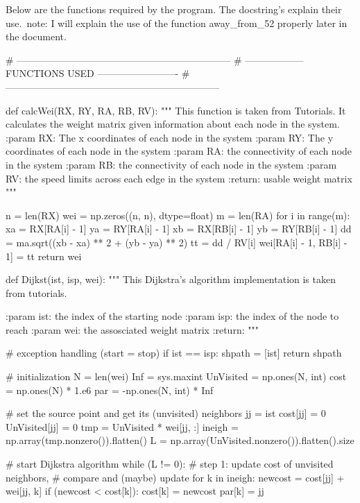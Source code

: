 \documentclass[paper=a4, fontsize=12pt]{scrartcl} %
\numberwithin{equation}{section}       %
\numberwithin{figure}{section}         %
\numberwithin{table}{section}          %
\begin{document}
Below are the functions required by the program. The docstring's explain their use.\
note: I will explain the use of the function away\_from\_52 properly later in the document.

\leavevmode
\newline

\begin{python}
# ------------------------------------------------------------------
# ------------------    FUNCTIONS USED     -------------------------
# ------------------------------------------------------------------

def calcWei(RX, RY, RA, RB, RV):
    """
    This function is taken from Tutorials. It calculates the weight matrix
    given information about each node in the system.
    :param RX: The x coordinates of each node in the system
    :param RY: The y coordinates of each node in the system
    :param RA: the connectivity of each node in the system
    :param RB: the connectivity of each node in the system
    :param RV: the speed limits across each edge in the system
    :return: usable weight matrix
    """

    n = len(RX)
    wei = np.zeros((n, n), dtype=float)
    m = len(RA)
    for i in range(m):
        xa = RX[RA[i] - 1]
        ya = RY[RA[i] - 1]
        xb = RX[RB[i] - 1]
        yb = RY[RB[i] - 1]
        dd = ma.sqrt((xb - xa) ** 2 + (yb - ya) ** 2)
        tt = dd / RV[i]
        wei[RA[i] - 1, RB[i] - 1] = tt
    return wei
    
def Dijkst(ist, isp, wei):
    """
    This Dijkstra's algorithm implementation is taken from tutorials.
    
    :param ist: the index of the starting node
    :param isp: the index of the node to reach
    :param wei: the assosciated weight matrix
    :return: 
    """

    # exception handling (start = stop)
    if ist == isp:
        shpath = [ist]
        return shpath

    # initialization
    N = len(wei)
    Inf = sys.maxint
    UnVisited = np.ones(N, int)
    cost = np.ones(N) * 1.e6
    par = -np.ones(N, int) * Inf

    # set the source point and get its (unvisited) neighbors
    jj = ist
    cost[jj] = 0
    UnVisited[jj] = 0
    tmp = UnVisited * wei[jj, :]
    ineigh = np.array(tmp.nonzero()).flatten()
    L = np.array(UnVisited.nonzero()).flatten().size

    # start Dijkstra algorithm
    while (L != 0):
        # step 1: update cost of unvisited neighbors,
        #         compare and (maybe) update
        for k in ineigh:
            newcost = cost[jj] + wei[jj, k]
            if (newcost < cost[k]):
                cost[k] = newcost
                par[k] = jj


\end{python}
\end{document}
